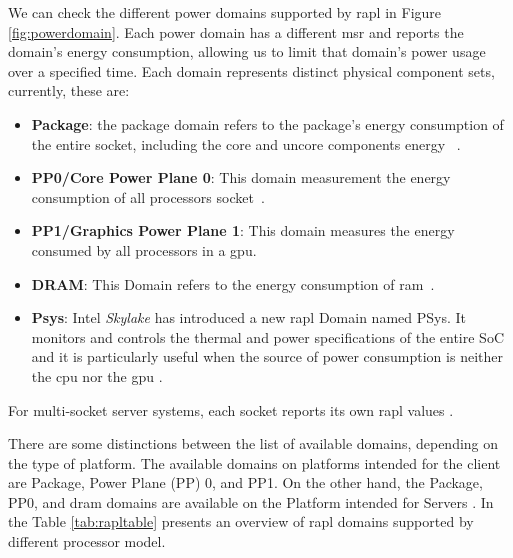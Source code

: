     We can check the different power domains supported by \gls{rapl} in Figure \ref{fig:powerdomain}. Each power domain has a different  \gls{msr}  and reports the domain's energy consumption, allowing us to limit that domain's power usage over a specified time. Each domain represents distinct physical component sets, currently, these are: 
    
    \begin{itemize}
        \item \textbf{Package}: the package domain refers to the package's energy consumption of the entire socket, including the core and uncore components energy ~\cite{intel64and}.
        \item \textbf{PP0/Core Power Plane 0}: This domain measurement the energy consumption of all processors socket~\cite{intel64and,portela2016}.
            \item \textbf{PP1/Graphics Power Plane 1}: This domain measures the energy consumed by all processors in a \gls{gpu}.
        \item \textbf{DRAM}: This Domain refers to the energy consumption of \gls{ram}~\cite{intel64and,portela2016}.
        \item \textbf{Psys}: Intel \textit{Skylake} has introduced a new \gls{rapl} Domain named PSys. It monitors and controls the thermal and power specifications of the entire SoC and it is particularly useful when the source of power consumption is neither the \gls{cpu} nor the \gls{gpu} \cite{raplpref}.
    \end{itemize}
    For multi-socket server systems, each socket reports its own \gls{rapl} values \cite{raplpref}.
    
    There are some distinctions between the list of available domains, depending on the type of platform. The available domains on platforms intended for the client are Package, Power Plane (PP) 0, and PP1. On the other hand, the Package, PP0, and \gls{dram} domains are available on the Platform intended for Servers \cite{raplpref2}.
    In the Table \ref{tab:rapltable} presents an overview of \gls{rapl} domains supported by different processor model.


